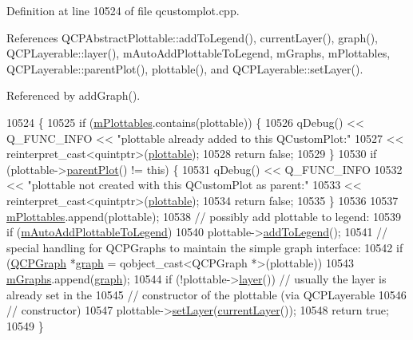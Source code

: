 Definition at line 10524 of file qcustomplot.\+cpp.



References Q\+C\+P\+Abstract\+Plottable\+::add\+To\+Legend(), current\+Layer(), graph(), Q\+C\+P\+Layerable\+::layer(), m\+Auto\+Add\+Plottable\+To\+Legend, m\+Graphs, m\+Plottables, Q\+C\+P\+Layerable\+::parent\+Plot(), plottable(), and Q\+C\+P\+Layerable\+::set\+Layer().



Referenced by add\+Graph().


\begin{DoxyCode}
10524                                                               \{
10525   \textcolor{keywordflow}{if} (\hyperlink{class_q_custom_plot_a4b6c694fbdb2f201626f71eff2d1694e}{mPlottables}.contains(plottable)) \{
10526     qDebug() << Q\_FUNC\_INFO << \textcolor{stringliteral}{"plottable already added to this QCustomPlot:"}
10527              << \textcolor{keyword}{reinterpret\_cast<}quintptr\textcolor{keyword}{>}(\hyperlink{class_q_custom_plot_adea38bdc660da9412ba69fb939031567}{plottable});
10528     \textcolor{keywordflow}{return} \textcolor{keyword}{false};
10529   \}
10530   \textcolor{keywordflow}{if} (plottable->\hyperlink{class_q_c_p_layerable_ab7e0e94461566093d36ffc0f5312b109}{parentPlot}() != \textcolor{keyword}{this}) \{
10531     qDebug() << Q\_FUNC\_INFO
10532              << \textcolor{stringliteral}{"plottable not created with this QCustomPlot as parent:"}
10533              << \textcolor{keyword}{reinterpret\_cast<}quintptr\textcolor{keyword}{>}(\hyperlink{class_q_custom_plot_adea38bdc660da9412ba69fb939031567}{plottable});
10534     \textcolor{keywordflow}{return} \textcolor{keyword}{false};
10535   \}
10536 
10537   \hyperlink{class_q_custom_plot_a4b6c694fbdb2f201626f71eff2d1694e}{mPlottables}.append(plottable);
10538   \textcolor{comment}{// possibly add plottable to legend:}
10539   \textcolor{keywordflow}{if} (\hyperlink{class_q_custom_plot_aaf3ea6a4cb04d35a149cc9a0cdac3394}{mAutoAddPlottableToLegend})
10540     plottable->\hyperlink{class_q_c_p_abstract_plottable_a70f8cabfd808f7d5204b9f18c45c13f5}{addToLegend}();
10541   \textcolor{comment}{// special handling for QCPGraphs to maintain the simple graph interface:}
10542   \textcolor{keywordflow}{if} (\hyperlink{class_q_c_p_graph}{QCPGraph} *\hyperlink{class_q_custom_plot_a80c40ced2a74eefe9e92de1e82ba2274}{graph} = qobject\_cast<QCPGraph *>(plottable))
10543     \hyperlink{class_q_custom_plot_a38676b141ac8005fca4882a73ddfaf59}{mGraphs}.append(\hyperlink{class_q_custom_plot_a80c40ced2a74eefe9e92de1e82ba2274}{graph});
10544   \textcolor{keywordflow}{if} (!plottable->\hyperlink{class_q_c_p_layerable_aea67e8c19145e70d68c286a36f6b8300}{layer}()) \textcolor{comment}{// usually the layer is already set in the}
10545                            \textcolor{comment}{// constructor of the plottable (via QCPLayerable}
10546                            \textcolor{comment}{// constructor)}
10547     plottable->\hyperlink{class_q_c_p_layerable_ab0d0da6d2de45a118886d2c8e16d5a54}{setLayer}(\hyperlink{class_q_custom_plot_af73057345656cbd1463454982d808b00}{currentLayer}());
10548   \textcolor{keywordflow}{return} \textcolor{keyword}{true};
10549 \}
\end{DoxyCode}


